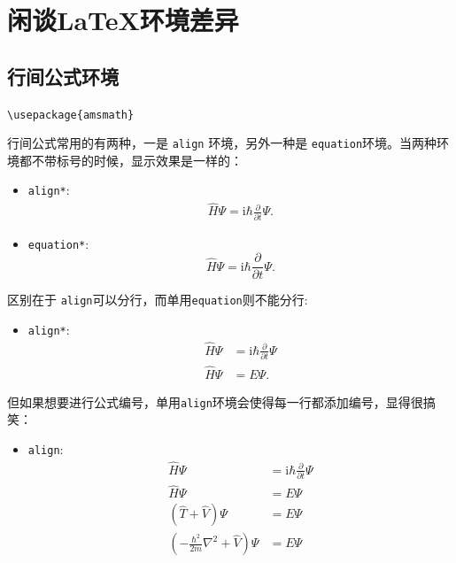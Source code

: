 \chapter{闲谈\LaTeX 环境差异}\label{ch:environment}


\section{行间公式环境}
\Verb"\usepackage{amsmath}"

行间公式常用的有两种，一是 \textcolor{red!50!black}{\Verb"align"} 环境，另外一种是 \textcolor{red!50!black}{\Verb"equation"}环境。当两种环境都不带标号的时候，显示效果是一样的：
\begin{itemize}
    \item \textcolor{red!50!black}{\Verb"align*"}:
    \begin{align*}
        \hat{H} \Psi = \mathrm{i} \hbar \frac{\partial}{\partial t} \Psi.
    \end{align*}
    \item \textcolor{red!50!black}{\Verb"equation*"}:
    \begin{equation*}
        \hat{H} \Psi = \mathrm{i} \hbar \frac{\partial}{\partial t} \Psi.
    \end{equation*}
\end{itemize}
区别在于 \textcolor{red!50!black}{\Verb"align"}可以分行，而单用\textcolor{red!50!black}{\Verb"equation"}则不能分行:
\begin{itemize}
    \item \textcolor{red!50!black}{\Verb"align*"}:
    \begin{align*}
        \hat{H} \Psi & = \mathrm{i} \hbar \frac{\partial}{\partial t} \Psi \\
        \hat{H} \Psi & = E \Psi.
    \end{align*}
\end{itemize}
但如果想要进行公式编号，单用\textcolor{red!50!black}{\Verb"align"}环境会使得每一行都添加编号，显得很搞笑：
\begin{itemize}
    \item \textcolor{red!50!black}{\Verb"align"}:
    \begin{align}
        \hat{H} \Psi & = \mathrm{i} \hbar \frac{\partial}{\partial t} \Psi \\
        \hat{H} \Psi & = E \Psi \\
        \left( \hat{T} + \hat{V} \right) \Psi & = E \Psi \\
        \left( - \frac{\hbar^2}{2 m} \nabla^2 + \hat{V} \right) \Psi & = E \Psi
    \end{align}
\end{itemize}
